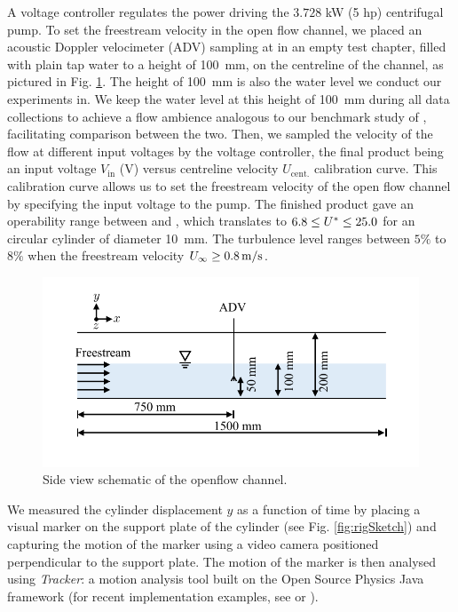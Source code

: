 \documentclass[oneside]{utmthesis}
\begin{document}
A voltage controller regulates the power driving the $3.728$ kW (5 hp) centrifugal pump. To set the freestream velocity in the open flow channel, we placed an acoustic Doppler velocimeter (ADV) sampling at in an empty test chapter, filled with plain tap water to a height of \SI{100}{\milli\metre}, on the centreline of the channel, as pictured in Fig. \ref{fig:channelSchematic}. The height of \SI{100}{\milli\metre} is also the water level we conduct our experiments in. We keep the water level at this height of \SI{100}{\milli\metre} during all data collections to achieve a flow ambience analogous to our benchmark study of \citet{Koide2013}, facilitating comparison between the two. Then, we sampled the velocity of the flow at different input voltages by the voltage controller, the final product being an input voltage $V_{\text{in}}$ (V) versus centreline velocity $U_{\text{cent.}}$ calibration curve. This calibration curve allows us to set the freestream velocity of the open flow channel by specifying the input voltage to the pump. The finished product gave an operability range between \uth{} and \uel{}, which translates to $6.8 \leq U^{*} \leq 25.0$ for an circular cylinder of diameter \SI{10}{\milli\metre}. The turbulence level ranges between $5\%$ to $8\%$ when the freestream velocity $U_{\infty} \geq \uei$.

\begin{figure}
  \centering
  \includegraphics[width=1\textwidth]{figs/channelSchematic}
  \caption{Side view schematic of the openflow channel.}
  \label{fig:channelSchematic}
\end{figure}

We measured the cylinder displacement $y$ as a function of time by placing a visual marker on the support plate of the cylinder (see Fig. \ref{fig:rigSketch}) and capturing the motion of the marker using a video camera positioned perpendicular to the support plate. The motion of the marker is then analysed using \textit{Tracker}: a motion analysis tool built on the Open Source Physics Java framework (for recent implementation examples, see \citet{Wen2020}  or \citet{Krishnendu2020}).
\end{document}
